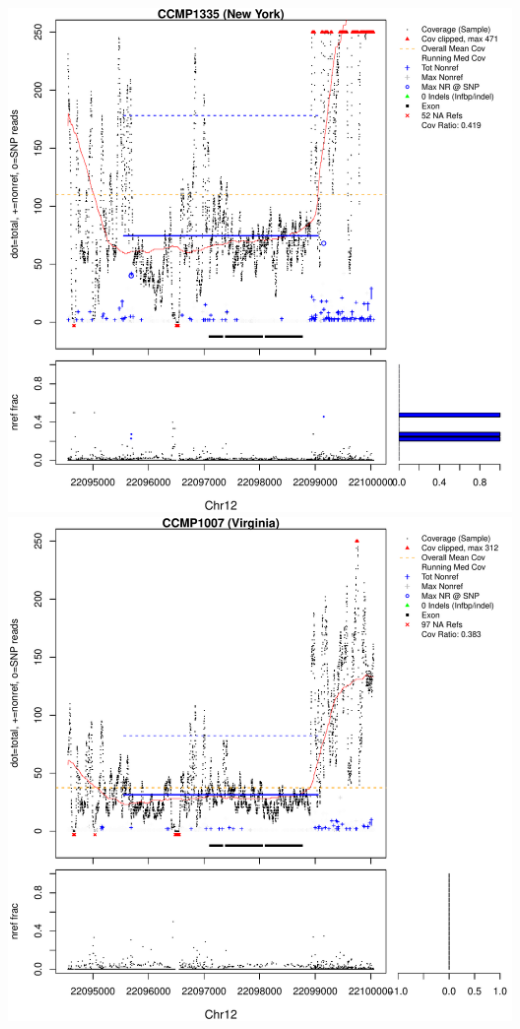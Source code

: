 \documentclass{article}\usepackage[]{graphicx}\usepackage[]{color}
\makeatletter
\def\maxwidth{ %
  \ifdim\Gin@nat@width>\linewidth
    \linewidth
  \else
    \Gin@nat@width
  \fi
}
\newenvironment{knitrout}{}{} %
\makeatother
\begin{document}
\begin{knitrout}
{\centering \includegraphics[width=\maxwidth]{figs-knitr/unnamed-chunk-55-1} 
\includegraphics[width=\maxwidth]{figs-knitr/unnamed-chunk-55-2} 
}
\end{knitrout}
\end{document}
